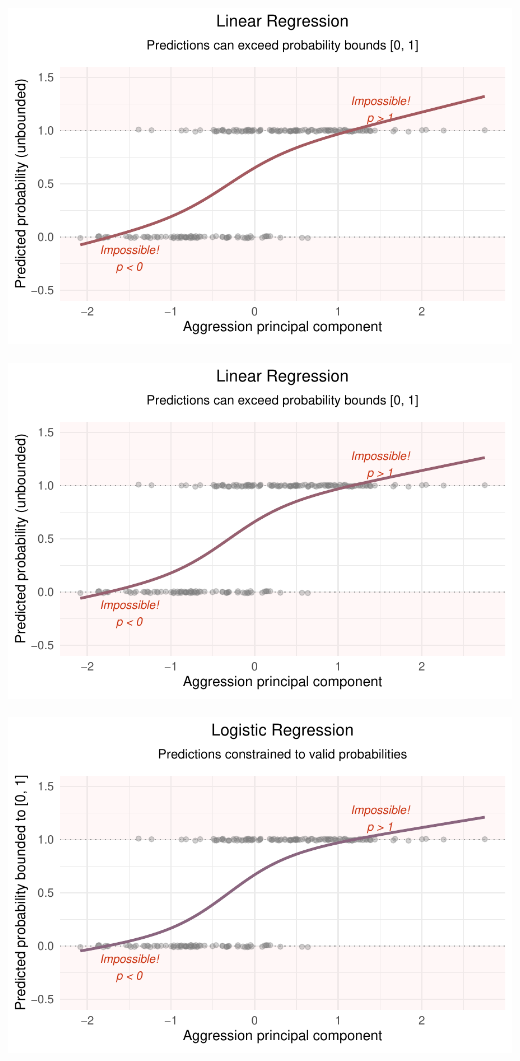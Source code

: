 \documentclass[
  letterpaper,
  DIV=11,
  numbers=noendperiod]{scrartcl}
\begin{document}
\begin{center}
\includegraphics[width=0.8\linewidth,height=\textheight,keepaspectratio]{Beyond!!!_files/figure-pdf/unnamed-chunk-4-36.pdf}
\end{center}

\begin{center}
\includegraphics[width=0.8\linewidth,height=\textheight,keepaspectratio]{Beyond!!!_files/figure-pdf/unnamed-chunk-4-37.pdf}
\end{center}

\begin{center}
\includegraphics[width=0.8\linewidth,height=\textheight,keepaspectratio]{Beyond!!!_files/figure-pdf/unnamed-chunk-4-38.pdf}
\end{center}
\end{document}
